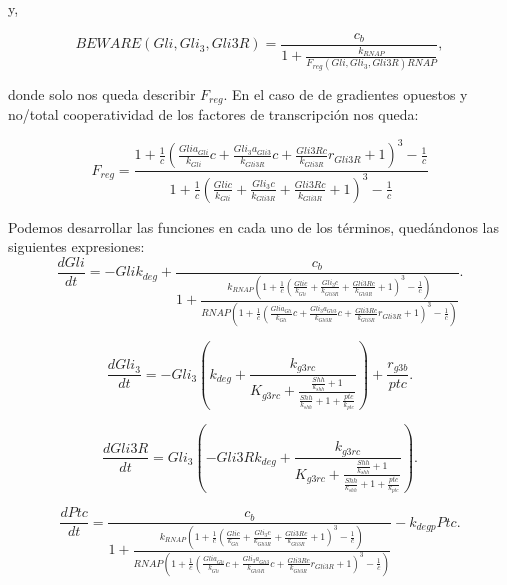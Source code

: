 y,


\begin{equation}
BEWARE(Gli, Gli_3, Gli3R)=\frac{c_{b}}{1 + \frac{k_{RNAP}}{F_{reg}(Gli, Gli_3, Gli3R) RNAP}},
\end{equation}

donde solo nos queda describir $F_{reg}$. En el caso de de gradientes opuestos y no/total cooperatividad de los factores de transcripción nos queda:

\begin{equation}
F_{reg}=\frac{1 + \frac{1}{c} \left(\frac{Gli a_{Gli}}{k_{Gli}} c + \frac{Gli_{3} a_{Gli3}}{k_{Gli3R}} c + \frac{Gli3R c}{k_{Gli3R}} r_{Gli3R} + 1\right)^{3} - \frac{1}{c}}{1 + \frac{1}{c} \left(\frac{Gli c}{k_{Gli}} + \frac{Gli_{3} c}{k_{Gli3R}} + \frac{Gli3R c}{k_{Gli3R}} + 1\right)^{3} - \frac{1}{c}}
\end{equation}






Podemos desarrollar las funciones en cada uno de los términos, quedándonos las siguientes expresiones:
\begin{equation}
\frac{dGli}{dt}=- Gli k_{deg} + \frac{c_{b}}{1 + \frac{k_{RNAP} \left(1 + \frac{1}{c} \left(\frac{Gli c}{k_{Gli}} + \frac{Gli_{3} c}{k_{Gli3R}} + \frac{Gli3R c}{k_{Gli3R}} + 1\right)^{3} - \frac{1}{c}\right)}{RNAP \left(1 + \frac{1}{c} \left(\frac{Gli a_{Gli}}{k_{Gli}} c + \frac{Gli_{3} a_{Gli3}}{k_{Gli3R}} c + \frac{Gli3R c}{k_{Gli3R}} r_{Gli3R} + 1\right)^{3} - \frac{1}{c}\right)}}.
\end{equation}


\begin{equation}
\frac{dGli_3}{dt}=- Gli_{3} \left(k_{deg} + \frac{k_{g3rc}}{K_{g3rc} + \frac{\frac{Shh}{k_{shh}} + 1}{\frac{Shh}{k_{shh}} + 1 + \frac{ptc}{k_{ptc}}}}\right) + \frac{r_{g3b}}{ptc}.
\end{equation}

\begin{equation}
\frac{dGli3R}{dt}=Gli_{3} \left(- Gli3R k_{deg} + \frac{k_{g3rc}}{K_{g3rc} + \frac{\frac{Shh}{k_{shh}} + 1}{\frac{Shh}{k_{shh}} + 1 + \frac{ptc}{k_{ptc}}}}\right).
\end{equation}

\begin{equation}
\frac{dPtc}{dt}=\frac{c_{b}}{1 + \frac{k_{RNAP} \left(1 + \frac{1}{c} \left(\frac{Gli c}{k_{Gli}} + \frac{Gli_{3} c}{k_{Gli3R}} + \frac{Gli3R c}{k_{Gli3R}} + 1\right)^{3} - \frac{1}{c}\right)}{RNAP \left(1 + \frac{1}{c} \left(\frac{Gli a_{Gli}}{k_{Gli}} c + \frac{Gli_{3} a_{Gli3}}{k_{Gli3R}} c + \frac{Gli3R c}{k_{Gli3R}} r_{Gli3R} + 1\right)^{3} - \frac{1}{c}\right)}} - k_{deg p} Ptc.
\end{equation}





